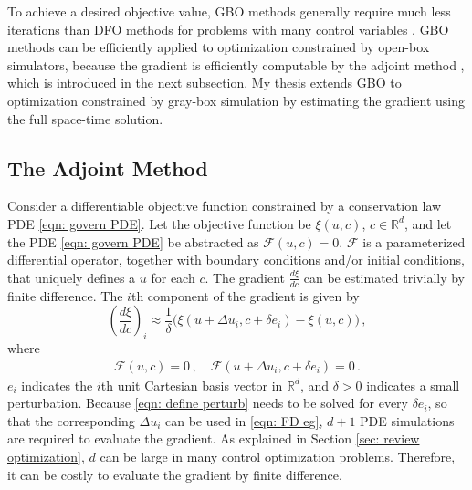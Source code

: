 \indent To achieve a desired objective value, 
GBO methods generally require much less iterations than DFO methods for problems with many 
control variables \cite{opt via sim review, nonlinear program}. GBO methods can be 
efficiently applied to 
optimization constrained by open-box simulators, because the gradient is efficiently computable by
the adjoint method \cite{adjoint, opt via sim review}, which is introduced in the next subsection.
My thesis extends GBO to optimization constrained by gray-box simulation by estimating 
the gradient using the full space-time solution.

\subsection{The Adjoint Method}
Consider a differentiable objective function constrained by a conservation law PDE 
\eqref{eqn: govern PDE}.
Let the objective function be $\xi(u,c)$, $c\in \mathbb{R}^d$, 
and let the PDE \eqref{eqn: govern PDE} be abstracted
as $\mathcal{F}(u,c) = 0$. 
$\mathcal{F}$ is a parameterized differential operator, 
together with boundary conditions and/or initial conditions, that uniquely defines a $u$ for each $c$.
The gradient $\frac{d\xi}{dc}$ can be estimated trivially by finite difference. The
$i$th component of the gradient is given by
\begin{equation}
    \left(\frac{d\xi}{dc}\right)_i \approx \frac{1}{\delta} \big( 
    \xi(u+ \Delta u_i, c+\delta e_i) - \xi(u, c) \big)\,,
    \label{eqn: FD eg}
\end{equation}
where
\begin{equation}\begin{split}
    \mathcal{F}(u,c)=0\,, \quad \mathcal{F}(u+\Delta u_i, c+ \delta e_i) = 0\,.
\end{split}
\label{eqn: define perturb}
\end{equation}
$e_i$ indicates the $i$th unit Cartesian basis vector in $\mathbb{R}^d$, and $\delta>0$ indicates
a small perturbation. 
Because \eqref{eqn: define perturb} needs to be solved for every $\delta e_i$, 
so that the corresponding $\Delta u_i$ can be used in \eqref{eqn: FD eg},
$d+1$ PDE simulations are required to evaluate the gradient.
As explained in Section \ref{sec: review optimization}, $d$ can be large in many
control optimization problems. Therefore, it can be costly to evaluate the gradient 
by finite difference.\\

